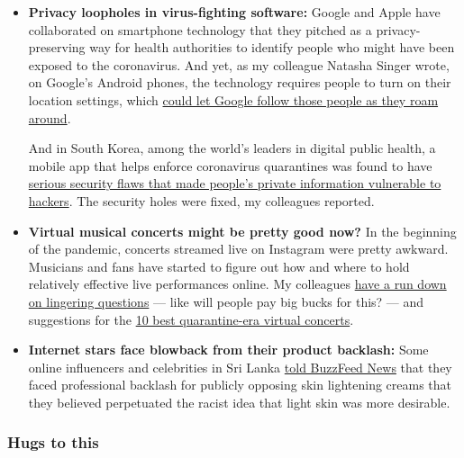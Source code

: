 \begin{itemize}
\item
  \textbf{Privacy loopholes in virus-fighting software:} Google and
  Apple have collaborated on smartphone technology that they pitched as
  a privacy-preserving way for health authorities to identify people who
  might have been exposed to the coronavirus. And yet, as my colleague
  Natasha Singer wrote, on Google's Android phones, the technology
  requires people to turn on their location settings, which
  \href{https://www.nytimes3xbfgragh.onion/2020/07/20/technology/google-covid-tracker-app.html}{could
  let Google follow those people as they roam around}.

  And in South Korea, among the world's leaders in digital public
  health, a mobile app that helps enforce coronavirus quarantines was
  found to have
  \href{https://www.nytimes3xbfgragh.onion/2020/07/21/technology/korea-coronavirus-app-security.html}{serious
  security flaws that made people's private information vulnerable to
  hackers}. The security holes were fixed, my colleagues reported.
\item
  \textbf{Virtual musical concerts might be pretty good now?} In the
  beginning of the pandemic, concerts streamed live on Instagram were
  pretty awkward. Musicians and fans have started to figure out how and
  where to hold relatively effective live performances online. My
  colleagues
  \href{https://www.nytimes3xbfgragh.onion/2020/07/21/arts/music/concerts-livestreams.html}{have
  a run down on lingering questions} --- like will people pay big bucks
  for this? --- and suggestions for the
  \href{https://www.nytimes3xbfgragh.onion/2020/07/21/arts/music/best-quarantine-concerts-livestream.html}{10
  best quarantine-era virtual concerts}.
\item
  \textbf{Internet stars face blowback from their product backlash:}
  Some online influencers and celebrities in Sri Lanka
  \href{https://www.buzzfeednews.com/article/meghara/unilever-sri-lankan-influencers-skin-whiteners}{told
  BuzzFeed News} that they faced professional backlash for publicly
  opposing skin lightening creams that they believed perpetuated the
  racist idea that light skin was more desirable.
\end{itemize}

\hypertarget{hugs-to-this}{%
\subsubsection{Hugs to this}\label{hugs-to-this}}

